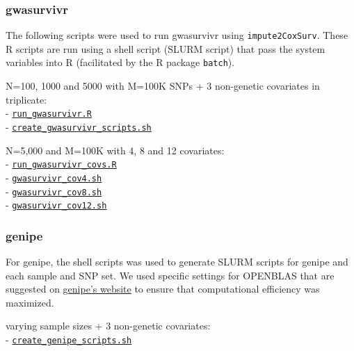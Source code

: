 \documentclass[]{DissertateUSU}
\begin{document}
\subsubsection{gwasurvivr}\label{gwasurvivr-1}

The following scripts were used to run gwasurvivr using
\texttt{impute2CoxSurv}. These R scripts are run using a shell script
(SLURM script) that pass the system variables into R (facilitated by the
R package \texttt{batch}).

N=100, 1000 and 5000 with M=100K SNPs + 3 non-genetic covariates in
triplicate:\\
-
\href{https://github.com/suchestoncampbelllab/gwasurvivr_manuscript/blob/master/benchmark_experiments/code/run_gwasurvivr.R}{\texttt{run\_gwasurvivr.R}}\\
-
\href{https://github.com/suchestoncampbelllab/gwasurvivr_manuscript/blob/master/benchmark_experiments/code/create_gwasurvivr_scripts.sh}{\texttt{create\_gwasurvivr\_scripts.sh}}

N=5,000 and M=100K with 4, 8 and 12 covariates:\\
-
\href{https://github.com/suchestoncampbelllab/gwasurvivr_manuscript/blob/master/diff_cov_benchmarks/code/run_gwasurvivr_covs.R}{\texttt{run\_gwasurvivr\_covs.R}}\\
-
\href{https://github.com/suchestoncampbelllab/gwasurvivr_manuscript/blob/master/diff_cov_benchmarks/code/gwasurvivr_cov4.sh}{\texttt{gwasurvivr\_cov4.sh}}\\
-
\href{https://github.com/suchestoncampbelllab/gwasurvivr_manuscript/blob/master/diff_cov_benchmarks/code/gwasurvivr_cov8.sh}{\texttt{gwasurvivr\_cov8.sh}}\\
-
\href{https://github.com/suchestoncampbelllab/gwasurvivr_manuscript/blob/master/diff_cov_benchmarks/code/gwasurvivr_cov12.sh}{\texttt{gwasurvivr\_cov12.sh}}

\subsubsection{genipe}\label{genipe}

For genipe, the shell scripts was used to generate SLURM scripts for
genipe and each sample and SNP set. We used specific settings for
OPENBLAS that are suggested on
\href{http://pgxcentre.github.io/genipe/execution_time.html}{genipe's
website} to ensure that computational efficiency was maximized.

varying sample sizes + 3 non-genetic covariates:\\
-
\href{https://github.com/suchestoncampbelllab/gwasurvivr_manuscript/blob/master/benchmark_experiments/code/create_genipe_scripts.sh}{\texttt{create\_genipe\_scripts.sh}}
\end{document}
